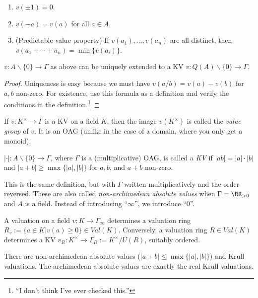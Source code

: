  \begin{proposition}
   \begin{enumerate}
     \item $v(\pm 1)=0$.
     \item $v(-a)=v(a)$ for all $a\in A$.
     \item (Predictable value property) If $v(a_1), \dots, v(a_n)$ are all distinct, then
     $v(a_1+\cdots +a_n)=\min \{v(a_i)\}$.
   \end{enumerate}
 \end{proposition}
 \begin{proposition}
   $v:A\smallsetminus \{0\} \to \Gamma$ as above can be uniquely extended to a KV
   $v:Q(A)\smallsetminus \{0\} \to \Gamma$.
 \end{proposition}
 \begin{proof}
   Uniqueness is easy because we must have $v(a/b)=v(a)-v(b)$ for $a,b$ non-zero. For
   existence, use this formula as a definition and verify the conditions in the
   definition.\footnote{``I don't think I've ever checked this.''}
 \end{proof}
 \begin{definition}
   If $v:K^\times \to \Gamma$ is a KV on a field $K$, then the image $v(K^\times)$ is called
   the \emph{value group} of $v$. It is an OAG (unlike in the case of a domain, where you
   only get a monoid).
 \end{definition}
 \begin{definition}
   $|\cdot|:A\smallsetminus \{0\}\to \Gamma$, where $\Gamma$ is a (multiplicative) OAG,
   is called a \emph{KV} if $|ab|=|a|\cdot |b|$ and $|a+b|\ge \max \{|a|,|b|\}$ for
   $a,b$, and $a+b$ non-zero.
 \end{definition}
 This is the same definition, but with $\Gamma$ written multiplicatively and the order
 reversed. These are also called \emph{non-archimedean absolute values} when $\Gamma =
 \RR_{> 0}$ and $A$ is a field. Instead of introducing ``$\infty$'', we introduce
 ``$0$''.

 \begin{theorem}
   A valuation on a field $v:K\to \Gamma_\infty$ determines a valuation ring $R_v:=
   \{a\in K|v(a)\ge 0\}\in Val(K)$. Conversely, a valuation ring $R\in Val(K)$ determines
   a KV $v_R:K^\times \to \Gamma_R:=K^\times /U(R)$, suitably ordered.
 \end{theorem}
 \setcounter{lecture}{34}

 There are non-archimedean absolute values ($|a+b|\le \max\{|a|,|b|\}$) and Krull
 valuations. The archimedean absolute values are exactly the real Krull valuations.

